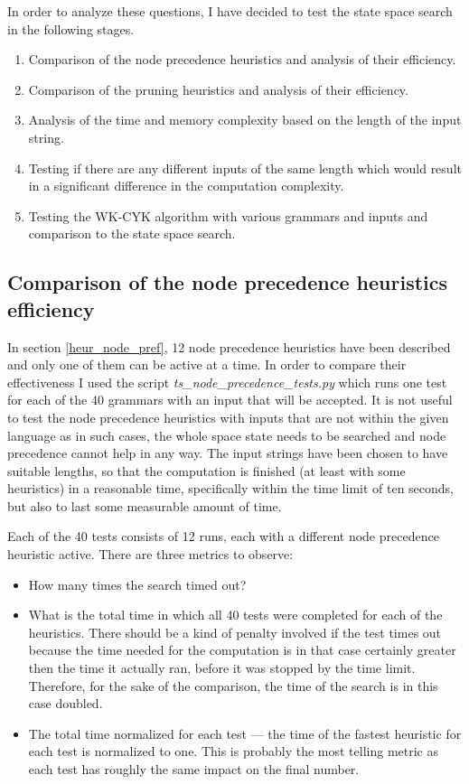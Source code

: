 In order to analyze these questions, I have decided to test the state space search in the following stages.
\begin{enumerate}
  \item{Comparison of the node precedence heuristics and analysis of their efficiency.}
  \item{Comparison of the pruning heuristics and analysis of their efficiency.}
  \item{Analysis of the time and memory complexity based on the length of the input string.}
  \item{Testing if there are any different inputs of the same length which would result in a significant difference in the computation complexity.}
  \item{Testing the WK-CYK algorithm with various grammars and inputs and comparison to the state space search.}
\end{enumerate}

\subsection{Comparison of the node precedence heuristics efficiency} \label{section:node_prec_test}
In section \ref{heur_node_pref}, 12 node precedence heuristics have been described and only one of them can be active at a time.
In order to compare their effectiveness I used the script \textit{ts\_node\_prece\-dence\_tests.py} which runs one test for each of the 40 grammars with an input that will be accepted. It is not useful to test the node precedence heuristics with inputs that are not within the given language as in such cases, the whole space state needs to be searched and node precedence cannot help in any way. The input strings have been chosen to have suitable lengths, so that the computation is finished (at least with some heuristics) in a reasonable time, specifically within the time limit of ten seconds, but also to last some measurable amount of time.

Each of the 40 tests consists of 12 runs, each with a different node precedence heuristic active. There are three metrics to observe:
\begin{itemize}
  \item{How many times the search timed out?}

  \item{What is the total time in which all 40 tests were completed for each of the heuristics. There should be a kind of penalty involved if the test times out because the time needed for the computation is in that case certainly greater then the time it actually ran, before it was stopped by the time limit. Therefore, for the sake of the comparison, the time of the search is in this case doubled.}

  \item{The total time normalized for each test --- the time of the fastest heuristic for each test is normalized to one. This is probably the most telling metric as each test has roughly the same impact on the final number.}
\end{itemize}

